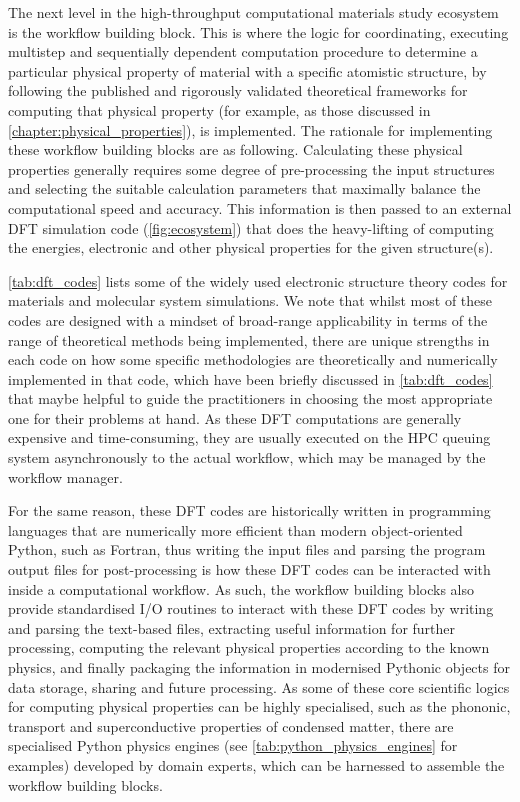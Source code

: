 The next level in the high-throughput computational materials study ecosystem is the workflow building block. This is where the logic for coordinating, executing multistep and sequentially dependent computation procedure to determine a particular physical property of material with a specific atomistic structure, by following the published and rigorously validated theoretical frameworks for computing that physical property (for example, as those discussed in \cref{chapter:physical_properties}), is implemented. The rationale for implementing these workflow building blocks are as following. Calculating these physical properties generally requires some degree of pre-processing the input structures and selecting the suitable calculation parameters that maximally balance the computational speed and accuracy. This information is then passed to an external DFT simulation code (\cref{fig:ecosystem}) that does the heavy-lifting of computing the energies, electronic and other physical properties for the given structure(s). 

\cref{tab:dft_codes} lists some of the widely used electronic structure theory codes for materials and molecular system simulations. We note that whilst most of these codes are designed with a mindset of broad-range applicability in terms of the range of theoretical methods being implemented, there are unique strengths in each code on how some specific methodologies are theoretically and numerically implemented in that code, which have been briefly discussed in \cref{tab:dft_codes} that maybe helpful to guide the practitioners in choosing the most appropriate one for their problems at hand.   As these DFT computations are generally expensive and time-consuming, they are usually executed on the HPC queuing system asynchronously to the actual workflow, which may be managed by the workflow manager. 

For the same reason, these DFT codes are historically written in programming languages that are numerically more efficient than modern object-oriented Python, such as Fortran, thus writing the input files and parsing the program output files for post-processing is how these DFT codes can be interacted with inside a computational workflow. As such, the workflow building blocks also provide standardised I/O routines to interact with these DFT codes by writing and parsing the text-based files, extracting useful information for further processing, computing the relevant physical properties according to the known physics, and finally packaging the information in modernised Pythonic objects for data storage, sharing and future processing. As some of these core scientific logics for computing physical properties can be highly specialised, such as the phononic, transport and superconductive properties of condensed matter, there are specialised Python physics engines (see \cref{tab:python_physics_engines} for examples) developed by domain experts, which can be harnessed to assemble the workflow building blocks.




